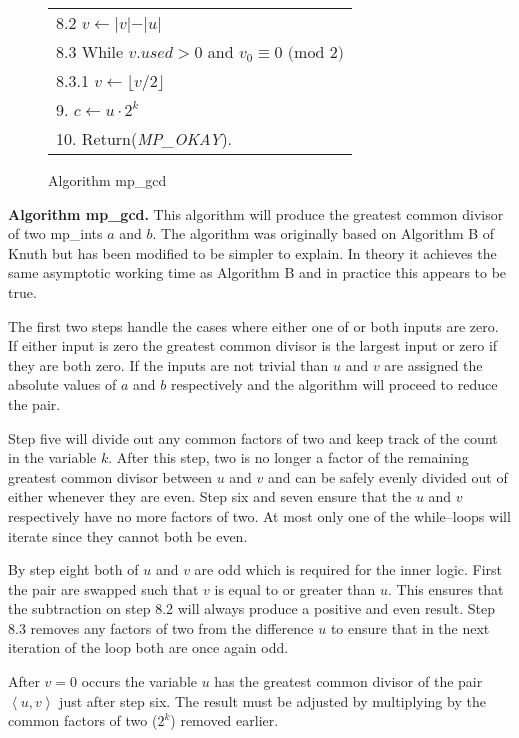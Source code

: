 \documentclass[b5paper]{book}
\begin{document}
\begin{figure}[!here]
\begin{small}
\begin{center}
\begin{tabular}{l}
\hspace{3mm}8.2  $v \leftarrow \vert v \vert - \vert u \vert$ \\
\hspace{3mm}8.3  While $v.used > 0$ and $v_0 \equiv 0 \mbox{ (mod }2\mbox{)}$ \\
\hspace{6mm}8.3.1  $v \leftarrow \lfloor v / 2 \rfloor$ \\
9.  $c \leftarrow u \cdot 2^k$ \\
10.  Return(\textit{MP\_OKAY}). \\
\hline
\end{tabular}
\end{center}
\end{small}
\caption{Algorithm mp\_gcd}
\end{figure}
\textbf{Algorithm mp\_gcd.}
This algorithm will produce the greatest common divisor of two mp\_ints $a$ and $b$.  The algorithm was originally based on Algorithm B of
Knuth \cite[pp. 338]{TAOCPV2} but has been modified to be simpler to explain.  In theory it achieves the same asymptotic working time as
Algorithm B and in practice this appears to be true.  

The first two steps handle the cases where either one of or both inputs are zero.  If either input is zero the greatest common divisor is the 
largest input or zero if they are both zero.  If the inputs are not trivial than $u$ and $v$ are assigned the absolute values of 
$a$ and $b$ respectively and the algorithm will proceed to reduce the pair.

Step five will divide out any common factors of two and keep track of the count in the variable $k$.  After this step, two is no longer a
factor of the remaining greatest common divisor between $u$ and $v$ and can be safely evenly divided out of either whenever they are even.  Step 
six and seven ensure that the $u$ and $v$ respectively have no more factors of two.  At most only one of the while--loops will iterate since 
they cannot both be even.

By step eight both of $u$ and $v$ are odd which is required for the inner logic.  First the pair are swapped such that $v$ is equal to
or greater than $u$.  This ensures that the subtraction on step 8.2 will always produce a positive and even result.  Step 8.3 removes any
factors of two from the difference $u$ to ensure that in the next iteration of the loop both are once again odd.

After $v = 0$ occurs the variable $u$ has the greatest common divisor of the pair $\left < u, v \right >$ just after step six.  The result
must be adjusted by multiplying by the common factors of two ($2^k$) removed earlier.  
\end{document}
